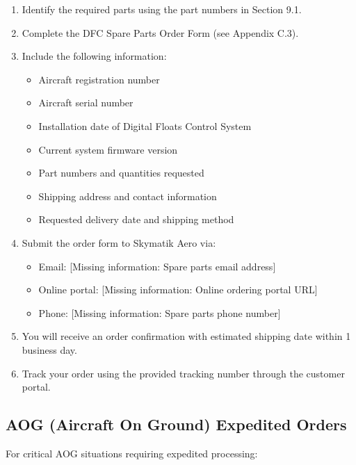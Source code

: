 \documentclass[12pt,a4paper,twoside,openright]{book}
\begin{document}
\begin{enumerate}
    \item Identify the required parts using the part numbers in Section 9.1.
    \item Complete the DFC Spare Parts Order Form (see Appendix C.3).
    \item Include the following information:
    \begin{itemize}
        \item Aircraft registration number
        \item Aircraft serial number
        \item Installation date of Digital Floats Control System
        \item Current system firmware version
        \item Part numbers and quantities requested
        \item Shipping address and contact information
        \item Requested delivery date and shipping method
    \end{itemize}
    \item Submit the order form to Skymatik Aero via:
    \begin{itemize}
        \item Email: {\color{missingred}[Missing information: Spare parts email address]}
        \item Online portal: {\color{missingred}[Missing information: Online ordering portal URL]}
        \item Phone: {\color{missingred}[Missing information: Spare parts phone number]}
    \end{itemize}
    \item You will receive an order confirmation with estimated shipping date within 1 business day.
    \item Track your order using the provided tracking number through the customer portal.
\end{enumerate}

\subsection{AOG (Aircraft On Ground) Expedited Orders}

For critical AOG situations requiring expedited processing:
\end{document}
